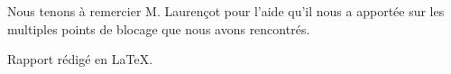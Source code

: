Nous tenons à remercier M. Laurençot pour l’aide qu’il nous a apportée sur les multiples points de blocage que nous avons rencontrés.

\vfill

\begin{center}
Rapport rédigé en \LaTeX.
\end{center}
